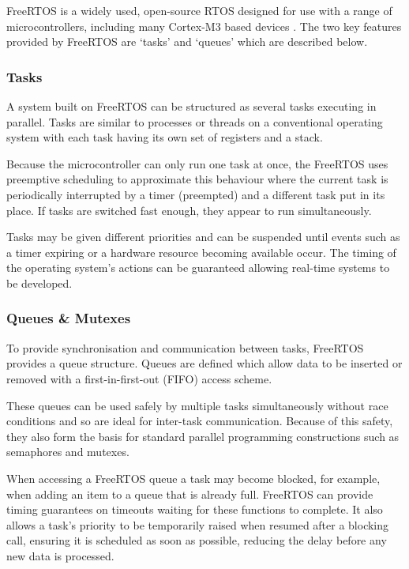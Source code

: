 			FreeRTOS is a widely used, open-source RTOS designed for use with a range
			of microcontrollers, including many Cortex-M3 based devices
			\cite{freertos}. The two key features provided by FreeRTOS are `tasks' and
			`queues' which are described below.
			
			\subsubsection{Tasks}
				
				A system built on FreeRTOS can be structured as several tasks
				executing in parallel. Tasks are similar to processes or threads on a
				conventional operating system with each task having its own set of
				registers and a stack.
				
				Because the microcontroller can only run one task at once, the FreeRTOS
				uses preemptive scheduling to approximate this behaviour where the
				current task is periodically interrupted by a timer (preempted) and a
				different task put in its place. If tasks are switched fast enough, they
				appear to run simultaneously.
				
				Tasks may be given different priorities and can be suspended until
				events such as a timer expiring or a hardware resource becoming
				available occur. The timing of the operating system's actions can be
				guaranteed allowing real-time systems to be developed.
				
			\subsubsection{Queues \& Mutexes}
				
				To provide synchronisation and communication between tasks, FreeRTOS
				provides a queue structure. Queues are defined which allow data to be
				inserted or removed with a first-in-first-out (FIFO) access scheme.
				
				These queues can be used safely by multiple tasks simultaneously without
				race conditions and so are ideal for inter-task communication.  Because
				of this safety, they also form the basis for standard parallel
				programming constructions such as semaphores and mutexes.
				
				When accessing a FreeRTOS queue a task may become blocked, for example,
				when adding an item to a queue that is already full. FreeRTOS can
				provide timing guarantees on timeouts waiting for these functions to
				complete. It also allows a task's priority to be temporarily raised when
				resumed after a blocking call, ensuring it is scheduled as soon as
				possible, reducing the delay before any new data is processed.
